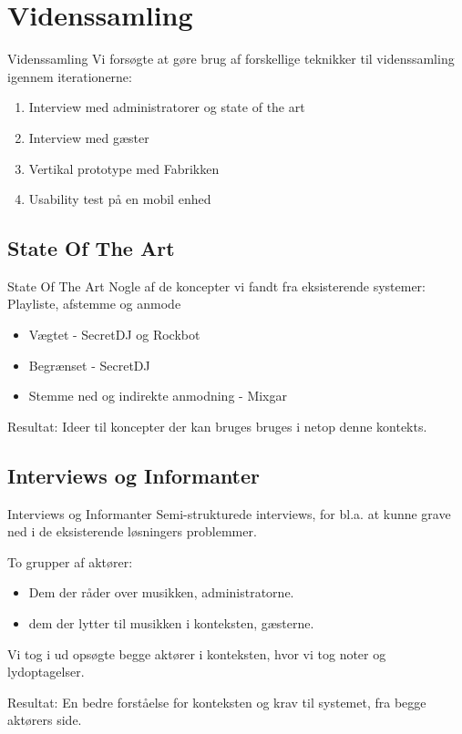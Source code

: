 \section{Videnssamling}
\begin{frame}{Videnssamling}
Vi forsøgte at gøre brug af forskellige teknikker til videnssamling igennem iterationerne:
\begin{enumerate}
\item Interview med administratorer og state of the art
\item Interview med gæster
\item Vertikal prototype med Fabrikken
\item Usability test på en mobil enhed
\end{enumerate}
\end{frame}

\subsection{State Of The Art}
\begin{frame}{State Of The Art}
	Nogle af de koncepter vi fandt fra eksisterende systemer:
	Playliste, afstemme og anmode
	\begin{itemize}
	\item Vægtet - SecretDJ og Rockbot
	\item Begrænset - SecretDJ
	\item Stemme ned og indirekte anmodning - Mixgar
	\end{itemize}

	Resultat: Ideer til koncepter der kan bruges bruges i netop denne kontekts.
\end{frame}
\subsection{Interviews og Informanter}
\begin{frame}{Interviews og Informanter}
	Semi-strukturede interviews, for bl.a. at kunne grave ned i de eksisterende løsningers problemmer.

	To grupper af aktører:
	\begin{itemize}
		\item Dem der råder over musikken, administratorne.
		\item dem der lytter til musikken i konteksten, gæsterne.
	\end{itemize}

	Vi tog i ud opsøgte begge aktører i konteksten, hvor vi tog noter og lydoptagelser.

	Resultat: En bedre forståelse for konteksten og krav til systemet, fra begge aktørers side.
\end{frame}
